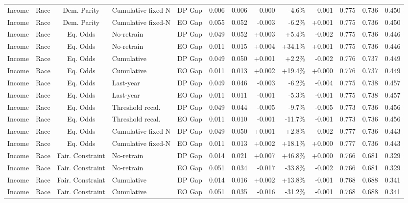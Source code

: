 \begin{longtable}{llcllrrrrrrrr}
Income & Race & Dem. Parity & Cumulative fixed-N & DP Gap & 0.006 & 0.006 & -0.000 & -4.6\% & -0.001 & 0.775 & 0.736 & 0.450 \\
Income & Race & Dem. Parity & Cumulative fixed-N & EO Gap & 0.055 & 0.052 & -0.003 & -6.2\% & +0.001 & 0.775 & 0.736 & 0.450 \\
Income & Race & Eq. Odds & No-retrain & DP Gap & 0.049 & 0.052 & +0.003 & +5.4\% & -0.002 & 0.775 & 0.736 & 0.446 \\
Income & Race & Eq. Odds & No-retrain & EO Gap & 0.011 & 0.015 & +0.004 & +34.1\% & +0.001 & 0.775 & 0.736 & 0.446 \\
Income & Race & Eq. Odds & Cumulative & DP Gap & 0.049 & 0.050 & +0.001 & +2.2\% & -0.002 & 0.776 & 0.737 & 0.449 \\
Income & Race & Eq. Odds & Cumulative & EO Gap & 0.011 & 0.013 & +0.002 & +19.4\% & +0.000 & 0.776 & 0.737 & 0.449 \\
Income & Race & Eq. Odds & Last-year & DP Gap & 0.049 & 0.046 & -0.003 & -6.2\% & -0.004 & 0.775 & 0.738 & 0.457 \\
Income & Race & Eq. Odds & Last-year & EO Gap & 0.011 & 0.011 & -0.001 & -5.3\% & -0.001 & 0.775 & 0.738 & 0.457 \\
Income & Race & Eq. Odds & Threshold recal. & DP Gap & 0.049 & 0.044 & -0.005 & -9.7\% & -0.005 & 0.773 & 0.736 & 0.456 \\
Income & Race & Eq. Odds & Threshold recal. & EO Gap & 0.011 & 0.010 & -0.001 & -11.7\% & -0.001 & 0.773 & 0.736 & 0.456 \\
Income & Race & Eq. Odds & Cumulative fixed-N & DP Gap & 0.049 & 0.050 & +0.001 & +2.8\% & -0.002 & 0.777 & 0.736 & 0.443 \\
Income & Race & Eq. Odds & Cumulative fixed-N & EO Gap & 0.011 & 0.013 & +0.002 & +18.1\% & +0.000 & 0.777 & 0.736 & 0.443 \\
Income & Race & Fair. Constraint & No-retrain & DP Gap & 0.014 & 0.021 & +0.007 & +46.8\% & +0.000 & 0.766 & 0.681 & 0.329 \\
Income & Race & Fair. Constraint & No-retrain & EO Gap & 0.051 & 0.034 & -0.017 & -33.8\% & -0.002 & 0.766 & 0.681 & 0.329 \\
Income & Race & Fair. Constraint & Cumulative & DP Gap & 0.014 & 0.016 & +0.002 & +13.8\% & -0.001 & 0.768 & 0.688 & 0.341 \\
Income & Race & Fair. Constraint & Cumulative & EO Gap & 0.051 & 0.035 & -0.016 & -31.2\% & -0.001 & 0.768 & 0.688 & 0.341 \\

\end{longtable}
